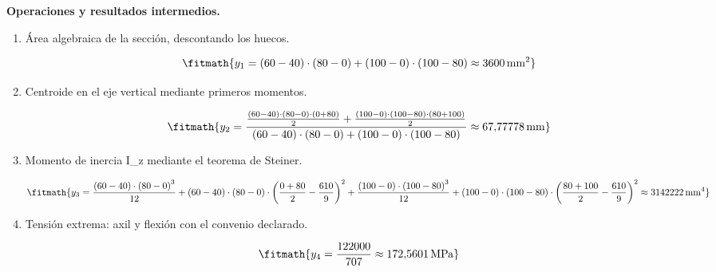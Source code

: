 \noindent\textbf{Operaciones y resultados intermedios.}

\begin{enumerate}

\item Área algebraica de la sección, descontando los huecos.

\[\fitmath{y_{1}=\left(60-40\right)\cdot \left(80-0\right)+\left(100-0\right)\cdot \left(100-80\right)\approx 3600\,\mathrm{mm^{2}}}\]

\item Centroide en el eje vertical mediante primeros momentos.

\[\fitmath{y_{2}=\frac{\frac{\left(60-40\right)\cdot \left(80-0\right)\cdot \left(0+80\right)}{2}+\frac{\left(100-0\right)\cdot \left(100-80\right)\cdot \left(80+100\right)}{2}}{\left(60-40\right)\cdot \left(80-0\right)+\left(100-0\right)\cdot \left(100-80\right)}\approx 67{,}77778\,\mathrm{mm}}\]

\item Momento de inercia I\_z mediante el teorema de Steiner.

\[\fitmath{y_{3}=\frac{\left(60-40\right)\cdot {\left(80-0\right)}^{3}}{12}+\left(60-40\right)\cdot \left(80-0\right)\cdot {\left(\frac{0+80}{2}-\frac{610}{9}\right)}^{2}+\frac{\left(100-0\right)\cdot {\left(100-80\right)}^{3}}{12}+\left(100-0\right)\cdot \left(100-80\right)\cdot {\left(\frac{80+100}{2}-\frac{610}{9}\right)}^{2}\approx 3142222\,\mathrm{mm^{4}}}\]

\item Tensión extrema: axil y flexión con el convenio declarado.

\[\fitmath{y_{4}=\frac{122000}{707}\approx 172{,}5601\,\mathrm{MPa}}\]

\end{enumerate}
